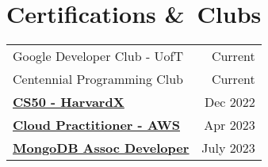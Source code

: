 
\section{Certifications \&\ Clubs}
\begin{tabular}{lr}
  Google Developer Club - UofT                                                                                                               & Current   \\
  Centennial Programming Club                                                                                                                & Current   \\
  \textbf{\underline{\href{https://certificates.cs50.io/5c64e9de-6da5-43d2-8e2d-f888535489b7.pdf?size=letter}{CS50 - HarvardX}}}             & Dec 2022  \\
  \textbf{\underline{\href{https://www.credly.com/badges/94d2934f-5383-4e1c-a55e-47515c806f7f/linked_in_profile}{Cloud Practitioner - AWS}}} & Apr 2023  \\
  \textbf{\underline{\href{https://www.credly.com/badges/21d50060-794b-4d25-b926-20b19de12ebe/linked_in_profile}{MongoDB Assoc Developer}}}  & July 2023
\end{tabular}
\sectionsep